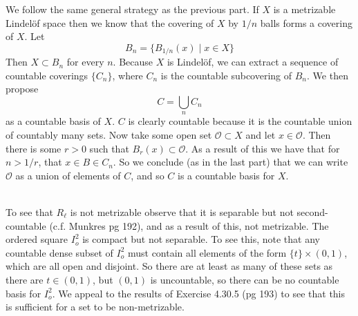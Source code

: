 \documentclass{article}
\DeclareMathOperator{\suchthat}{\mathrel{|}}
\newcommand{\problem}[1]{\noindent{\textbf{Problem #1}}\\}
\newcommand{\problempart}[1]{\noindent{\textbf{(#1)}}}
\begin{document}
\problempart{b} We follow the same general strategy as the previous part. If $X$ is a metrizable Lindel\"{o}f space then we know that the covering of $X$ by $1/n$ balls forms a covering of $X$. Let 
\[
B_n = \{B_{1/n}(x) \suchthat x \in X\}
\]
Then $X \subset B_n$ for every $n$. Because $X$ is Lindel\"{o}f, we can extract a sequence of countable coverings $\{C_n\}$, where $C_n$ is the countable subcovering of $B_n$. We then propose 
\[
C = \bigcup_{n} C_n
\]
as a countable basis of $X$. $C$ is clearly countable because it is the countable union of countably many sets. Now take some open set $\mathcal{O} \subset X$ and let $x \in \mathcal{O}$. Then there is some $r > 0$ such that $B_r(x) \subset \mathcal{O}$. As a result of this we have that for $n > 1/r$, that $x \in B \in C_n$. So we conclude (as in the last part) that we can write $\mathcal{O}$ as a union of elements of $C$, and so $C$ is a countable basis for $X$.

\problem{4.30.6} To see that $R_\ell$ is not metrizable observe that it is separable but not second-countable (c.f. Munkres pg 192), and as a result of this, not metrizable. The ordered square $I_o^2$ is compact but not separable. To see this, note that any countable dense subset of $I_o^2$ must contain all elements of the form $\{t\} \times (0,1)$, which are all open and disjoint. So there are at least as many of these sets as there are $t \in (0,1)$, but $(0,1)$ is uncountable, so there can be no countable basis for $I_o^2$. We appeal to the results of Exercise 4.30.5 (pg 193) to see that this is sufficient for a set to be non-metrizable. 
\end{document}
